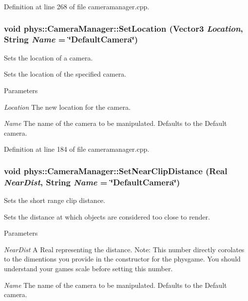 Definition at line 268 of file cameramanager.cpp.

\hypertarget{classphys_1_1CameraManager_a3f1b48057ca2c1cd79f3e61c9fcbe1b4}{
\subsubsection[{SetLocation}]{\setlength{\rightskip}{0pt plus 5cm}void phys::CameraManager::SetLocation ({\bf Vector3} {\em Location}, \/  {\bf String} {\em Name} = {\ttfamily \char`\"{}DefaultCamera\char`\"{}})}}
\label{d9/d91/classphys_1_1CameraManager_a3f1b48057ca2c1cd79f3e61c9fcbe1b4}


Sets the location of a camera. 

Sets the location of the specified camera. 
\begin{DoxyParams}{Parameters}
\item[{\em Location}]The new location for the camera. \item[{\em Name}]The name of the camera to be manipulated. Defaults to the Default camera. \end{DoxyParams}


Definition at line 184 of file cameramanager.cpp.

\hypertarget{classphys_1_1CameraManager_ad639c275a2bb1c6c05a8800f8e8412c6}{
\subsubsection[{SetNearClipDistance}]{\setlength{\rightskip}{0pt plus 5cm}void phys::CameraManager::SetNearClipDistance ({\bf Real} {\em NearDist}, \/  {\bf String} {\em Name} = {\ttfamily \char`\"{}DefaultCamera\char`\"{}})}}
\label{d9/d91/classphys_1_1CameraManager_ad639c275a2bb1c6c05a8800f8e8412c6}


Sets the short range clip distance. 

Sets the distance at which objects are considered too close to render. 
\begin{DoxyParams}{Parameters}
\item[{\em NearDist}]A Real representing the distance. Note: This number directly corolates to the dimentions you provide in the constructor for the physgame. You should understand your games scale before setting this number. \item[{\em Name}]The name of the camera to be manipulated. Defaults to the Default camera. \end{DoxyParams}



